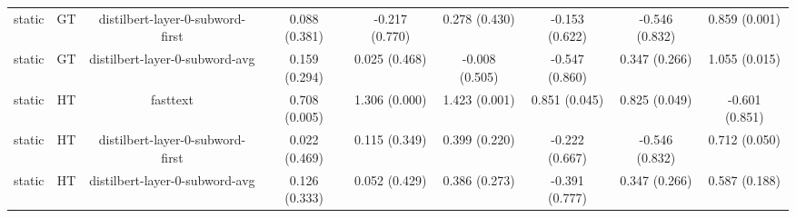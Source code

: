 \begin{sidewaystable}[htb]
\begin{tabular}{@{}ccccccccc@{}}
        static & GT & distilbert-layer-0-subword-first & 0.088 (0.381) & -0.217 (0.770) & 0.278 (0.430) & -0.153 (0.622) & -0.546 (0.832) & 0.859 (0.001) \\
        static & GT & distilbert-layer-0-subword-avg & 0.159 (0.294) & 0.025 (0.468) & -0.008 (0.505) & -0.547 (0.860) & 0.347 (0.266) & 1.055 (0.015) \\
        static & HT & fasttext & 0.708 (0.005) & 1.306 (0.000) & 1.423 (0.001) & 0.851 (0.045) & 0.825 (0.049) & -0.601 (0.851) \\
        static & HT & distilbert-layer-0-subword-first & 0.022 (0.469) & 0.115 (0.349) & 0.399 (0.220) & -0.222 (0.667) & -0.546 (0.832) & 0.712 (0.050) \\
        static & HT & distilbert-layer-0-subword-avg & 0.126 (0.333) & 0.052 (0.429) & 0.386 (0.273) & -0.391 (0.777) & 0.347 (0.266) & 0.587 (0.188) \\
        \bottomrule
    \end{tabular}
\end{sidewaystable}